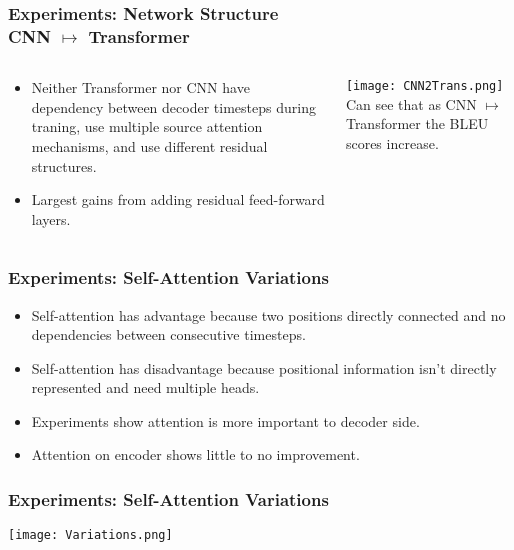 \begin{frame}
    \frametitle{Experiments: Network Structure\\\small{\vspace{-1.5em}CNN
    $\mapsto$ Transformer}}
    \begin{columns}
        \begin{column}{0.55\paperwidth}
            \begin{itemize}
                \item Neither Transformer nor CNN have dependency between
                    decoder timesteps during traning, use multiple source
                    attention mechanisms, and use different residual structures.
                \item Largest gains from adding residual feed-forward layers. 
            \end{itemize}
        \end{column}
        \begin{column}{0.4\paperwidth}
            \texttt{[image: CNN2Trans.png]}
            Can see that as CNN $\mapsto$ Transformer the BLEU scores increase.
        \end{column}
    \end{columns}
\end{frame}

\begin{frame}
    \frametitle{Experiments: Self-Attention Variations}
    \begin{itemize}
        \item Self-attention has advantage because two positions directly
            connected and no dependencies between consecutive timesteps.
        \item Self-attention has disadvantage because positional information
            isn't directly represented and need multiple heads.
        \item Experiments show attention is more important to decoder side.
        \item Attention on encoder shows little to no improvement.
    \end{itemize}
\end{frame}

\begin{frame}
    \frametitle{Experiments: Self-Attention Variations}
    \texttt{[image: Variations.png]}
\end{frame}
